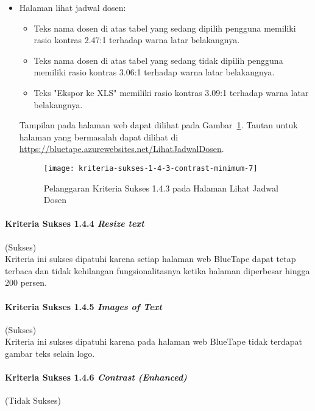 \begin{itemize}
    \item Halaman lihat jadwal dosen: 
    \begin{itemize}
        \item Teks nama dosen di atas tabel yang sedang dipilih pengguna memiliki rasio kontras 2.47:1 terhadap warna latar belakangnya.
        \item Teks nama dosen di atas tabel yang sedang tidak dipilih pengguna memiliki rasio kontras 3.06:1 terhadap warna latar belakangnya.
        \item Teks "Ekspor ke XLS" memiliki rasio kontras 3.09:1 terhadap warna latar belakangnya.
    \end{itemize}
    Tampilan pada halaman web dapat dilihat pada \mbox{Gambar \ref{fig:1.4.3_contrast_minimum_7}}. Tautan untuk halaman yang bermasalah dapat dilihat di \url{https://bluetape.azurewebsites.net/LihatJadwalDosen}.
    \begin{figure}[H]
        \centering  
        \texttt{[image: kriteria-sukses-1-4-3-contrast-minimum-7]}  
        \caption[Pelanggaran Kriteria Sukses 1.4.3 pada Halaman Lihat Jadwal Dosen]{Pelanggaran Kriteria Sukses 1.4.3 pada Halaman Lihat Jadwal Dosen}
        \label{fig:1.4.3_contrast_minimum_7}  
    \end{figure} 
\end{itemize}

\paragraph{Kriteria Sukses 1.4.4 \textit{Resize text}}
\label{par:kepatuhan_bluetape_kriteria_sukses_1.4.4}
(Sukses)\\

Kriteria ini sukses dipatuhi karena setiap halaman web BlueTape dapat tetap terbaca dan tidak kehilangan fungsionalitasnya ketika halaman diperbesar hingga 200 persen. 

\paragraph{Kriteria Sukses 1.4.5 \textit{Images of Text}}
\label{par:kepatuhan_bluetape_kriteria_sukses_1.4.5}
(Sukses)\\

Kriteria ini sukses dipatuhi karena pada halaman web BlueTape tidak terdapat gambar teks selain logo.

\paragraph{Kriteria Sukses 1.4.6 \textit{Contrast (Enhanced)}}
\label{par:kepatuhan_bluetape_kriteria_sukses_1.4.6}
(Tidak Sukses)\\

